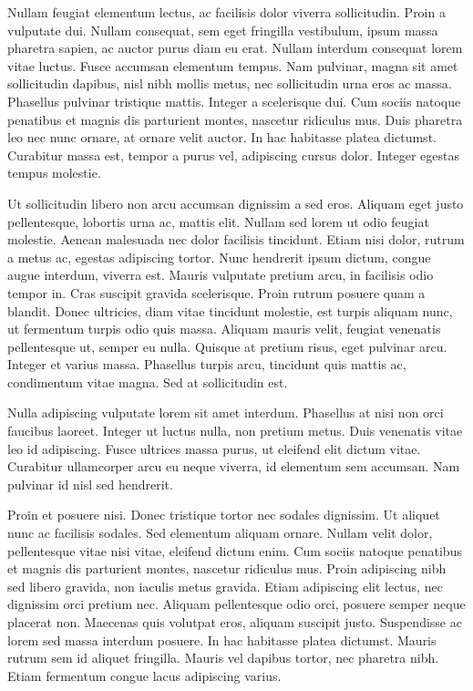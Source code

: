 \documentclass[2pt,a4paper,twoside ]{article}
\begin{document}
\begin{multicols}{2}
Nullam feugiat elementum lectus, ac facilisis dolor viverra sollicitudin. Proin a vulputate dui. Nullam consequat, sem eget fringilla vestibulum, ipsum massa pharetra sapien, ac auctor purus diam eu erat. Nullam interdum consequat lorem vitae luctus. Fusce accumsan elementum tempus. Nam pulvinar, magna sit amet sollicitudin dapibus, nisl nibh mollis metus, nec sollicitudin urna eros ac massa. Phasellus pulvinar tristique mattis. Integer a scelerisque dui. Cum sociis natoque penatibus et magnis dis parturient montes, nascetur ridiculus mus. Duis pharetra leo nec nunc ornare, at ornare velit auctor. In hac habitasse platea dictumst. Curabitur massa est, tempor a purus vel, adipiscing cursus dolor. Integer egestas tempus molestie.

Ut sollicitudin libero non arcu accumsan dignissim a sed eros. Aliquam eget justo pellentesque, lobortis urna ac, mattis elit. Nullam sed lorem ut odio feugiat molestie. Aenean malesuada nec dolor facilisis tincidunt. Etiam nisi dolor, rutrum a metus ac, egestas adipiscing tortor. Nunc hendrerit ipsum dictum, congue augue interdum, viverra est. Mauris vulputate pretium arcu, in facilisis odio tempor in. Cras suscipit gravida scelerisque. Proin rutrum posuere quam a blandit. Donec ultricies, diam vitae tincidunt molestie, est turpis aliquam nunc, ut fermentum turpis odio quis massa. Aliquam mauris velit, feugiat venenatis pellentesque ut, semper eu nulla. Quisque at pretium risus, eget pulvinar arcu. Integer et varius massa. Phasellus turpis arcu, tincidunt quis mattis ac, condimentum vitae magna. Sed at sollicitudin est.

Nulla adipiscing vulputate lorem sit amet interdum. Phasellus at nisi non orci faucibus laoreet. Integer ut luctus nulla, non pretium metus. Duis venenatis vitae leo id adipiscing. Fusce ultrices massa purus, ut eleifend elit dictum vitae. Curabitur ullamcorper arcu eu neque viverra, id elementum sem accumsan. Nam pulvinar id nisl sed hendrerit.

Proin et posuere nisi. Donec tristique tortor nec sodales dignissim. Ut aliquet nunc ac facilisis sodales. Sed elementum aliquam ornare. Nullam velit dolor, pellentesque vitae nisi vitae, eleifend dictum enim. Cum sociis natoque penatibus et magnis dis parturient montes, nascetur ridiculus mus. Proin adipiscing nibh sed libero gravida, non iaculis metus gravida. Etiam adipiscing elit lectus, nec dignissim orci pretium nec. Aliquam pellentesque odio orci, posuere semper neque placerat non. Maecenas quis volutpat eros, aliquam suscipit justo. Suspendisse ac lorem sed massa interdum posuere. In hac habitasse platea dictumst. Mauris rutrum sem id aliquet fringilla. Mauris vel dapibus tortor, nec pharetra nibh. Etiam fermentum congue lacus adipiscing varius.


\end{multicols}
\end{document}
